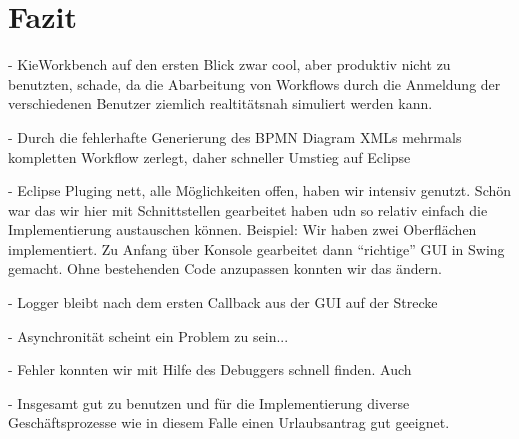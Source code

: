 \section{Fazit}
- KieWorkbench auf den ersten Blick zwar cool, aber produktiv nicht zu benutzten, schade, da die Abarbeitung von Workflows durch die Anmeldung der verschiedenen Benutzer ziemlich realtitätsnah simuliert werden kann.

- Durch die fehlerhafte Generierung des BPMN Diagram XMLs mehrmals kompletten Workflow zerlegt, daher schneller Umstieg auf Eclipse

- Eclipse Pluging nett, alle Möglichkeiten offen, haben wir intensiv genutzt. Schön war das wir hier mit Schnittstellen gearbeitet haben udn so relativ einfach die Implementierung austauschen können. Beispiel: Wir haben zwei Oberflächen implementiert. Zu Anfang über Konsole gearbeitet dann "`richtige"' GUI in Swing gemacht. Ohne bestehenden Code anzupassen konnten wir das ändern.

- Logger bleibt nach dem ersten Callback aus der GUI auf der Strecke

- Asynchronität scheint ein Problem zu sein...

- Fehler konnten wir mit Hilfe des Debuggers schnell finden. Auch 

- Insgesamt gut zu benutzen und für die Implementierung diverse Geschäftsprozesse wie in diesem Falle einen Urlaubsantrag gut geeignet. 
